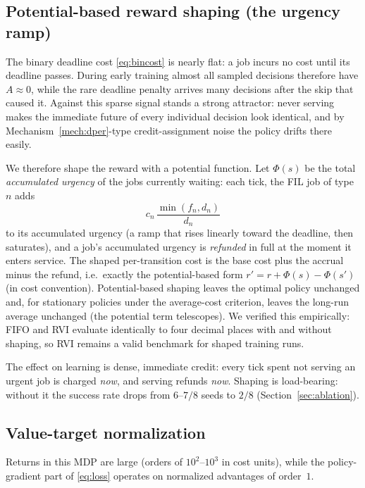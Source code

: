 \documentclass[11pt,a4paper]{article}
\begin{document}
\subsection{Potential-based reward shaping (the urgency ramp)}
\label{sec:shaping}

The binary deadline cost \eqref{eq:bincost} is nearly flat: a job
incurs no cost until its deadline passes.  During early training almost
all sampled decisions therefore have $A \approx 0$, while the rare
deadline penalty arrives many decisions after the skip that caused it.
Against this sparse signal stands a strong attractor: never serving
makes the immediate future of every individual decision look identical,
and by Mechanism~\ref{mech:dper}-type credit-assignment noise the policy
drifts there easily.

We therefore shape the reward with a potential function.  Let
$\Phi(s)$ be the total \emph{accumulated urgency} of the jobs currently
waiting: each tick, the FIL job of type $n$ adds
\begin{equation}
  c_n \,\frac{\min(f_n, d_n)}{d_n}
  \label{eq:ramp}
\end{equation}
to its accumulated urgency (a ramp that rises linearly toward the
deadline, then saturates), and a job's accumulated urgency is
\emph{refunded} in full at the moment it enters service.  The shaped
per-transition cost is the base cost plus the accrual minus the refund,
i.e.\ exactly the potential-based form
$r' = r + \Phi(s) - \Phi(s')$ (in cost convention).  Potential-based
shaping leaves the optimal policy unchanged and, for stationary policies
under the average-cost criterion, leaves the long-run average unchanged
(the potential term telescopes).  We verified this empirically: FIFO and
RVI evaluate identically to four decimal places with and without
shaping, so RVI remains a valid benchmark for shaped training runs.

The effect on learning is dense, immediate credit: every tick spent not
serving an urgent job is charged \emph{now}, and serving refunds
\emph{now}.  Shaping is load-bearing: without it the success rate drops
from $6$--$7/8$ seeds to $2/8$ (Section~\ref{sec:ablation}).

\subsection{Value-target normalization}
\label{sec:vnorm}

Returns in this MDP are large (orders of $10^2$--$10^3$ in cost units),
while the policy-gradient part of \eqref{eq:loss} operates on
normalized advantages of order~$1$.
\end{document}
